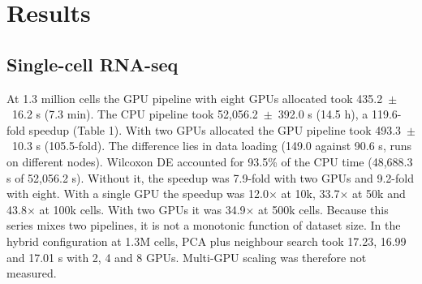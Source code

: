 \documentclass[runningheads]{llncs}
\begin{document}
\hypertarget{results}{%
\section{Results}\label{results}}

\hypertarget{single-cell-rna-seq-1}{%
\subsection{Single-cell RNA-seq}\label{single-cell-rna-seq-1}}

At 1.3 million cells the GPU pipeline with eight GPUs allocated took 435.2~$\pm$~16.2 s (7.3 min).
The CPU pipeline took 52,056.2~$\pm$~392.0 s (14.5 h), a 119.6-fold speedup (Table 1).
With two GPUs allocated the GPU pipeline took 493.3~$\pm$~10.3 s (105.5-fold).
The difference lies in data loading (149.0 against 90.6 s, runs on different nodes).
Wilcoxon DE accounted for 93.5\% of the CPU time (48,688.3 s of 52,056.2 s).
Without it, the speedup was 7.9-fold with two GPUs and 9.2-fold with eight.
With a single GPU the speedup was 12.0$\times$ at 10k, 33.7$\times$ at 50k and 43.8$\times$ at 100k cells.
With two GPUs it was 34.9$\times$ at 500k cells.
Because this series mixes two pipelines, it is not a monotonic function of dataset size.
In the hybrid configuration at 1.3M cells, PCA plus neighbour search took 17.23, 16.99 and 17.01 s with 2, 4 and 8 GPUs.
Multi-GPU scaling was therefore not measured.
\end{document}
